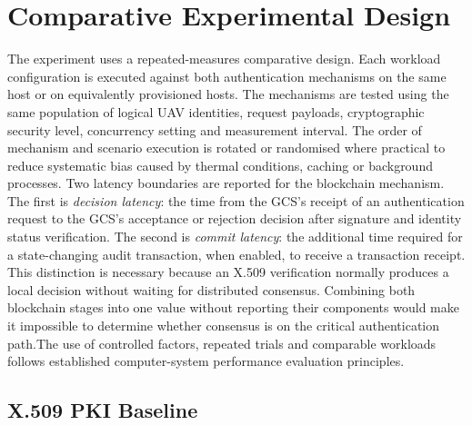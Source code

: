 \section{Comparative Experimental Design}
\label{sec:comparative-design}
The experiment uses a repeated-measures comparative design. Each workload configuration is executed against both authentication mechanisms on the same host or on equivalently provisioned hosts. The mechanisms are tested using the same population of logical UAV identities, request payloads, cryptographic security level, concurrency setting and measurement interval. The order of mechanism and scenario execution is rotated or randomised where practical to reduce systematic bias caused by thermal conditions, caching or background processes.
\noindent
Two latency boundaries are reported for the blockchain mechanism. The first is \emph{decision latency}: the time from the GCS's receipt of an authentication request to the GCS's acceptance or rejection decision after signature and identity status verification. The second is \emph{commit latency}: the additional time required for a state-changing audit transaction, when enabled, to receive a transaction receipt. This distinction is necessary because an X.509 verification normally produces a local decision without waiting for distributed consensus. Combining both blockchain stages into one value without reporting their components would make it impossible to determine whether consensus is on the critical authentication path.The use of controlled factors, repeated trials and comparable workloads follows established computer-system performance evaluation principles\cite{Jain1991Performance}.

\subsection{X.509 PKI Baseline}
\label{subsec:pki-baseline}

